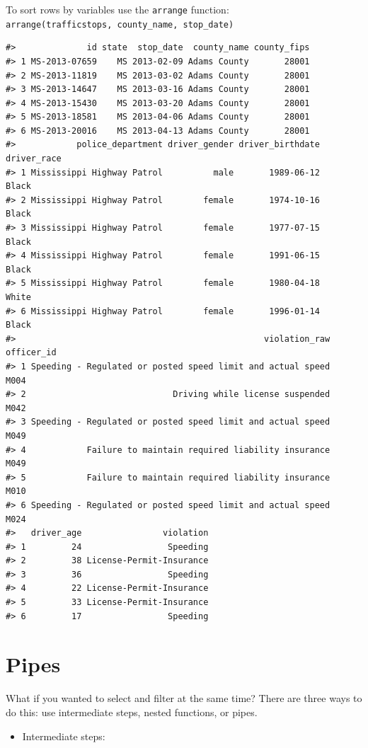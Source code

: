 \documentclass[]{book}
\providecommand{\tightlist}{%
  \setlength{\itemsep}{0pt}\setlength{\parskip}{0pt}}
\theoremstyle{definition}
\theoremstyle{definition}
\theoremstyle{definition}
\theoremstyle{remark}
\begin{document}
To sort rows by variables use the \texttt{arrange} function:
\texttt{arrange(trafficstops,\ county\_name,\ stop\_date)}

\begin{verbatim}
#>              id state  stop_date  county_name county_fips
#> 1 MS-2013-07659    MS 2013-02-09 Adams County       28001
#> 2 MS-2013-11819    MS 2013-03-02 Adams County       28001
#> 3 MS-2013-14647    MS 2013-03-16 Adams County       28001
#> 4 MS-2013-15430    MS 2013-03-20 Adams County       28001
#> 5 MS-2013-18581    MS 2013-04-06 Adams County       28001
#> 6 MS-2013-20016    MS 2013-04-13 Adams County       28001
#>            police_department driver_gender driver_birthdate driver_race
#> 1 Mississippi Highway Patrol          male       1989-06-12       Black
#> 2 Mississippi Highway Patrol        female       1974-10-16       Black
#> 3 Mississippi Highway Patrol        female       1977-07-15       Black
#> 4 Mississippi Highway Patrol        female       1991-06-15       Black
#> 5 Mississippi Highway Patrol        female       1980-04-18       White
#> 6 Mississippi Highway Patrol        female       1996-01-14       Black
#>                                                 violation_raw officer_id
#> 1 Speeding - Regulated or posted speed limit and actual speed       M004
#> 2                             Driving while license suspended       M042
#> 3 Speeding - Regulated or posted speed limit and actual speed       M049
#> 4            Failure to maintain required liability insurance       M049
#> 5            Failure to maintain required liability insurance       M010
#> 6 Speeding - Regulated or posted speed limit and actual speed       M024
#>   driver_age                violation
#> 1         24                 Speeding
#> 2         38 License-Permit-Insurance
#> 3         36                 Speeding
#> 4         22 License-Permit-Insurance
#> 5         33 License-Permit-Insurance
#> 6         17                 Speeding
\end{verbatim}

\section{Pipes}\label{pipes}

What if you wanted to select and filter at the same time? There are
three ways to do this: use intermediate steps, nested functions, or
pipes.

\begin{itemize}
\tightlist
\item
  Intermediate steps:
\end{itemize}
\end{document}
